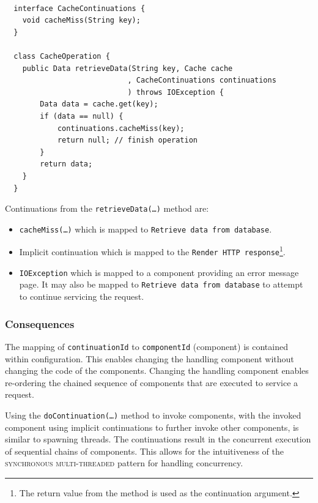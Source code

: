 \documentclass[prodmode]{style/acmlarge}
\begin{document}
\lstset{caption=Example developer implementation code for a component\protect\footnotemark}
\begin{lstlisting}[float,label=lst:Example_Method_Operation]

  interface CacheContinuations {
    void cacheMiss(String key);
  }

  class CacheOperation {    
    public Data retrieveData(String key, Cache cache
                            , CacheContinuations continuations
                            ) throws IOException {
        Data data = cache.get(key);
        if (data == null) {
            continuations.cacheMiss(key);
            return null; // finish operation
        }
        return data;
    }
  }
\end{lstlisting}

Continuations from the \texttt{retrieveData(\ldots)} method are:
\begin{itemize}
  \item \texttt{cacheMiss(\ldots)} which is mapped to \texttt{Retrieve data from database}.
  \item Implicit continuation which is mapped to the \texttt{Render HTTP response}\footnote{The return value from the method is used as the continuation argument.}.
  \item \texttt{IOException} which is mapped to a component providing an error message page.  It may also be mapped to \texttt{Retrieve data from database} to attempt to continue servicing the request.
\end{itemize}


\subsubsection*{Consequences}

The mapping of \texttt{continuationId} to \texttt{componentId} (component) is
contained within configuration.  This enables changing the handling component
without changing the code of the components.  Changing the handling component
enables re-ordering the chained sequence of components that are executed to
service a request.

Using the \texttt{doContinuation(\ldots)} method to invoke components, with the
invoked component using implicit continuations to further invoke other
components, is similar to spawning threads.  The continuations result in the
concurrent execution of sequential chains of components.  This allows for the
intuitiveness of the \textsc{synchronous multi-threaded} pattern \cite{proactor}
for handling concurrency.
\end{document}
